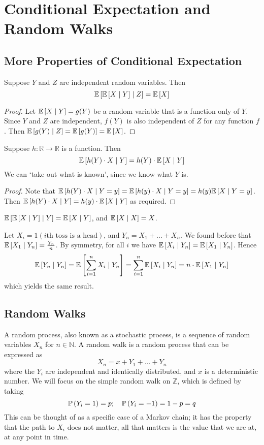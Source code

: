 \documentclass{article}
\begin{document}
\section{Conditional Expectation and Random Walks}
\subsection{More Properties of Conditional Expectation}
\begin{proposition}
	Suppose $Y$ and $Z$ are independent random variables. Then
	\[ \mathbb{E}\left[{\mathbb{E}\left[{X \mid Y}\right] \mid Z}\right] = \mathbb{E}\left[{X}\right] \]
\end{proposition}
\begin{proof}
	Let $\mathbb{E}\left[{X \mid Y}\right] = g(Y)$ be a random variable that is a function only of $Y$. Since $Y$ and $Z$ are independent, $f(Y)$ is also independent of $Z$ for any function $f$. Then $\mathbb{E}\left[{g(Y) \mid Z}\right] = \mathbb{E}\left[{g(Y)}\right] = \mathbb{E}\left[{X}\right]$.
\end{proof}
\begin{proposition}
	Suppose $h \colon \mathbb R \to \mathbb R$ is a function. Then
	\[ \mathbb{E}\left[{h(Y) \cdot X \mid Y}\right] = h(Y) \cdot \mathbb{E}\left[{X \mid Y}\right] \]
	We can `take out what is known', since we know what $Y$ is.
\end{proposition}
\begin{proof}
	Note that $\mathbb{E}\left[{h(Y) \cdot X \mid Y = y}\right] = \mathbb{E}\left[{h(y) \cdot X \mid Y = y}\right] = h(y) \mathbb{E}\left[{X \mid Y = y}\right]$. Then $\mathbb{E}\left[{h(Y) \cdot X \mid Y}\right] = h(y) \cdot \mathbb{E}\left[{X \mid Y}\right]$ as required.
\end{proof}
\begin{corollary}
	$\mathbb{E}\left[{\mathbb{E}\left[{X \mid Y}\right] \mid Y}\right] = \mathbb{E}\left[{X \mid Y}\right]$, and $\mathbb{E}\left[{X \mid X}\right] = X$.
\end{corollary}
\noindent Let $X_i = 1(i\text{th toss is a head})$, and $Y_n = X_1 + \dots + X_n$. We found before that $\mathbb{E}\left[{X_1 \mid Y_n}\right] = \frac{Y_n}{n}$. By symmetry, for all $i$ we have $\mathbb{E}\left[{X_i \mid Y_n}\right] = \mathbb{E}\left[{X_1 \mid Y_n}\right]$. Hence
\[ \mathbb{E}\left[{Y_n \mid Y_n}\right] = \mathbb{E}\left[{\sum_{i=1}^n X_i \mid Y_n}\right] = \sum_{i=1}^n \mathbb{E}\left[{X_i \mid Y_n}\right] = n \cdot \mathbb{E}\left[{X_1 \mid Y_n}\right] \]
which yields the same result.

\subsection{Random Walks}
A random process, also known as a stochastic process, is a sequence of random variables $X_n$ for $n \in \mathbb N$. A random walk is a random process that can be expressed as
\[ X_n = x + Y_1 + \dots + Y_n \]
where the $Y_i$ are independent and identically distributed, and $x$ is a deterministic number. We will focus on the simple random walk on $\mathbb Z$, which is defined by taking
\[ \mathbb{P}\left({Y_i = 1}\right) = p;\quad \mathbb{P}\left({Y_i = -1}\right) = 1-p = q \]
This can be thought of as a specific case of a Markov chain; it has the property that the path to $X_i$ does not matter, all that matters is the value that we are at, at any point in time.
\end{document}
